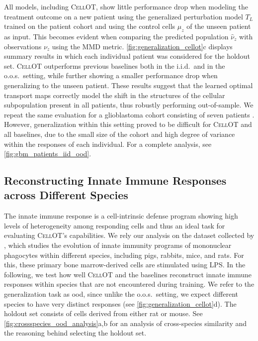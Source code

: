  All models, including \textsc{CellOT}, show little performance drop when modeling the treatment outcome on a new patient using the generalized perturbation model $T_L$ trained on the patient cohort and using the control cells $\mu_z$ of the unseen patient as input.
This becomes evident when comparing the predicted population $\hat{\nu}_z$ with observations $\nu_z$ using the \acrshort{MMD} metric. \cref{fig:generalization_cellot}c displays summary results in which each individual patient was considered for the holdout set. \textsc{CellOT} outperforms previous baselines both in the i.i.d.~and in the o.o.s.~setting, while further showing a smaller performance drop when generalizing to the unseen patient.
These results suggest that the learned optimal transport maps correctly model the shift in the structures of the cellular subpopulation present in all patients, thus robustly performing out-of-sample.
We repeat the same evaluation for a glioblastoma cohort consisting of seven patients \citep{zhao2021deconvolution}. However, generalization within this setting proved to be difficult for \textsc{CellOT} and all baselines, due to the small size of the cohort and high degree of variance within the responses of each individual. 
For a complete analysis, see \cref{fig:gbm_patients_iid_ood}.


\subsection{Reconstructing Innate Immune Responses across Different Species}

The innate immune response is a cell-intrinsic defense program showing high levels of heterogeneity among responding cells and thus an ideal task for evaluating \textsc{CellOT}'s capabilities. We rely our analysis on the dataset collected by \citet{hagai2018gene}, which studies the evolution of innate immunity programs of mononuclear phagocytes within different species, including pigs, rabbits, mice, and rats. For this, these primary bone marrow-derived cells are stimulated using \acrshort{LPS}.
In the following, we test how well \textsc{CellOT} and the baselines reconstruct innate immune responses within species that are not encountered during training. We refer to the generalization task as \acrfull{ood}, since unlike the o.o.s.~setting, we expect different species to have very distinct responses (see \cref{fig:generalization_cellot}d).
The holdout set consists of cells derived from either rat or mouse. See \cref{fig:crossspecies_ood_analysis}a,b for an analysis of cross-species similarity and the reasoning behind selecting the holdout set.

